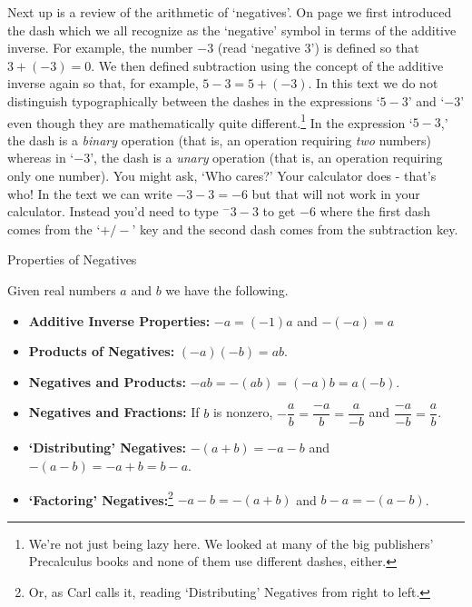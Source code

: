 Next up is a review of the arithmetic of `negatives'. On page \pageref{box:realnumberaddition} we first introduced the dash which we all recognize as the `negative' symbol in terms of the additive inverse.  For example, the number $-3$ (read `negative $3$') is defined so that $3 + (-3) = 0$.  We then defined subtraction using the concept of the additive inverse again so that, for example, $5 - 3 = 5 + (-3)$.  In this text we do not distinguish typographically between the dashes in the expressions `$5-3$' and `$-3$' even though they are mathematically quite different.\footnote{We're not just being lazy here.  We looked at many of the big publishers' Precalculus books and none of them use different dashes, either.} In the expression `$5-3$,' the dash is a \textit{binary} operation (that is, an operation requiring \textit{two} numbers) whereas in `$-3$', the dash is a \textit{unary} operation (that is, an operation requiring only one number).  You might ask, `Who cares?'  Your calculator does - that's who!  In the text we can write $-3 - 3 = -6$ but that will not work in your calculator.  Instead you'd need to type $^{-}3 - 3$ to get $-6$ where the first dash comes from the `$+/-$' key and the second dash comes from the subtraction key.

\begin{floatbox}[label=box:propertiesofnegatives]{Properties of Negatives}

Given real numbers $a$ and $b$ we have the following.  

\begin{itemize}

\item  \textbf{Additive Inverse Properties:}  $-a = (-1)a$ and $-(-a) = a$
\item  \textbf{Products of Negatives:} $(-a)(-b) = ab$. 
\item  \textbf{Negatives and Products:} $-ab = -(ab) = (-a)b = a(-b)$.
\item  \textbf{Negatives and Fractions:} If $b$ is nonzero, $-\dfrac{a}{b} = \dfrac{-a}{b} = \dfrac{a}{-b}$ and $\dfrac{-a}{-b} = \dfrac{a}{b}$.
\item  \textbf{`Distributing' Negatives:}  $-(a+b) = -a-b$ and $-(a-b) = -a + b = b-a$.
\item  \textbf{`Factoring' Negatives:}\footnote{Or, as Carl calls it, reading `Distributing' Negatives from right to left.} $-a-b = -(a+b)$ and $b-a = -(a-b)$.

\end{itemize}

\end{floatbox}

